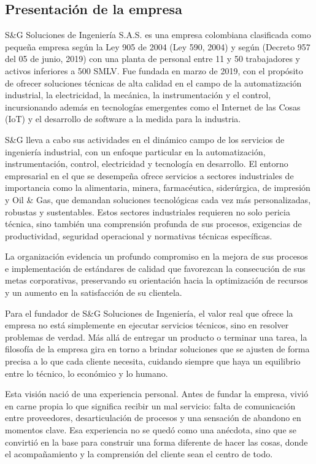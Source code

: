 \subsection{Presentación de la empresa}

S\&G Soluciones de Ingeniería S.A.S. es una empresa colombiana clasificada como pequeña empresa según la Ley 905 de 2004 (Ley 590, 2004) y según (Decreto 957 del 05 de junio, 2019) con una planta de personal entre 11 y 50 trabajadores y activos inferiores a 500 SMLV. Fue fundada en marzo de 2019, con el propósito de ofrecer soluciones técnicas de alta calidad en el campo de la automatización industrial, la electricidad, la mecánica, la instrumentación y el control, incursionando además en tecnologías emergentes como el Internet de las Cosas (IoT) y el desarrollo de software a la medida para la industria.

S\&G lleva a cabo sus actividades en el dinámico campo de los servicios de ingeniería industrial, con un enfoque particular en la automatización, instrumentación, control, electricidad y tecnología en desarrollo. El entorno empresarial en el que se desempeña ofrece servicios a sectores industriales de importancia como la alimentaria, minera, farmacéutica, siderúrgica, de impresión y Oil \& Gas, que demandan soluciones tecnológicas cada vez más personalizadas, robustas y sustentables.   Estos sectores industriales requieren no solo pericia técnica, sino también una comprensión profunda de sus procesos, exigencias de productividad, seguridad operacional y normativas técnicas específicas. 

La organización evidencia un profundo compromiso en la mejora de sus procesos e implementación de estándares de calidad que favorezcan la consecución de sus metas corporativas, preservando su orientación hacia la optimización de recursos y un aumento en la satisfacción de su clientela.

Para el fundador de S\&G Soluciones de Ingeniería, el valor real que ofrece la empresa no está simplemente en ejecutar servicios técnicos, sino en resolver problemas de verdad. Más allá de entregar un producto o terminar una tarea, la filosofía de la empresa gira en torno a brindar soluciones que se ajusten de forma precisa a lo que cada cliente necesita, cuidando siempre que haya un equilibrio entre lo técnico, lo económico y lo humano.

Esta visión nació de una experiencia personal. Antes de fundar la empresa, vivió en carne propia lo que significa recibir un mal servicio: falta de comunicación entre proveedores, desarticulación de procesos y una sensación de abandono en momentos clave. Esa experiencia no se quedó como una anécdota, sino que se convirtió en la base para construir una forma diferente de hacer las cosas, donde el acompañamiento y la comprensión del cliente sean el centro de todo.

